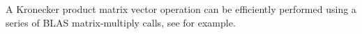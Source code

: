 A Kronecker product matrix vector operation can be efficiently performed using a series of BLAS matrix-multiply calls, see \cite{buis1996efficient} for example.












